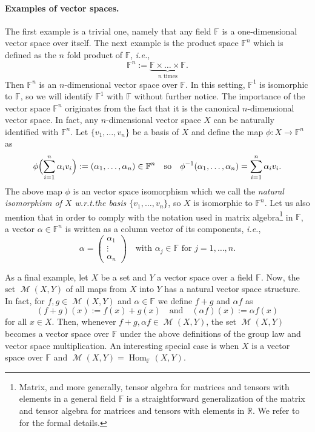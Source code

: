 \documentclass[a4paper]{paper}
\newcommand{\Field}{\mathbb{F}}
\newcommand{\Real}{\mathbb{R}}
\newcommand{\Complex}{\mathbb{C}}
\DeclareMathOperator{\Hom}{Hom}
\DeclareMathOperator{\Map}{\mathcal{M}}
\newcommand{\ie}{\textsl{i.e.}\xspace}
\begin{document}
\paragraph{Examples of vector spaces.}
The first example is a trivial one, namely that any field $\Field$ is a one-dimensional 
vector space over itself. The next example is the product space $\Field^{n}$ which is  defined as 
the $n$ fold product of $\Field$, \ie,
\[ \Field^{n} := \underbrace{\Field \times \ldots \times \Field}_{\text{$n$ times}}. \]
Then $\Field^{n}$ is an $n$-dimensional vector space 
over $\Field$. In this setting, $\Field^1$ is isomorphic to $\Field$, so we will identify $\Field^1$ with $\Field$
without further notice. The importance of the vector space $\Field^{n}$ originates from the fact 
that it is the canonical $n$-dimensional vector space. In fact, any $n$-dimensional vector 
space $X$ can be naturally identified 
with $\Field^{n}$. Let  $\{ v_1,\ldots, v_{n} \}$ be a basis of $X$ and define the map 
$\phi \colon X \to \Field^{n}$ as
\[  \phi\Bigl( \sum_{i=1}^n \alpha_i v_i \Bigr) := (\alpha_1,\ldots,\alpha_{n})\in\Field^{n}
    \quad\text{so}\quad 
    \phi^{-1}(\alpha_1,\ldots,\alpha_{n}) = \sum_{i=1}^n \alpha_i v_i.
\]
The above map $\phi$ is an vector space isomorphism which we call the \emph{natural 
isomorphism of $X$ w.r.t.\@ the basis $\{ v_1,\ldots, v_{n} \}$}, so $X$ is isomorphic to $\Field^{n}$.
Let us also mention that in order to comply with the notation used in 
matrix algebra\footnote{Matrix, and more generally, tensor algebra for matrices and tensors with 
elements in a general field $\Field$ is a straightforward generalization of the matrix and 
tensor algebra for matrices and tensors with elements in $\Real$. 
We refer to \cite[Chapter~II, Section~10 and Chapter~III]{Bo89} for the formal details.} 
in $\Field$, a vector $\alpha\in\Field^{n}$ is written as a column vector of its components, 
\ie,
\[ \alpha = \begin{pmatrix} \alpha_1 \\  \vdots \\  \alpha_{n} \end{pmatrix}
   \quad\text{with $\alpha_j \in \Field $ for $j=1,\ldots,n$.}
\]

As a final example,  let $X$ be a set and $Y$ a vector space over a field $\Field$. Now, the 
set $\Map(X,Y)$ of all maps from $X$ into $Y$ has a natural vector space 
structure. In fact, for $f,g\in \Map(X,Y)$ and $\alpha\in\Field$ we define $f+g$ and $\alpha f$ as 
\[ (f+g)(x):= f(x)+g(x) \quad\text{and}\quad (\alpha f)(x):=\alpha f(x) \]
for all $x\in X$. Then, whenever $f+g, \alpha f\in  \Map(X,Y)$, the set $\Map(X,Y)$ becomes
a vector space over $\Field$ under the above definitions of the group law and vector space 
multiplication. An interesting special case is when $X$ is a vector space over $\Field$ and 
$\Map(X,Y)= \Hom_{\Field}(X,Y)$.





\end{document}
